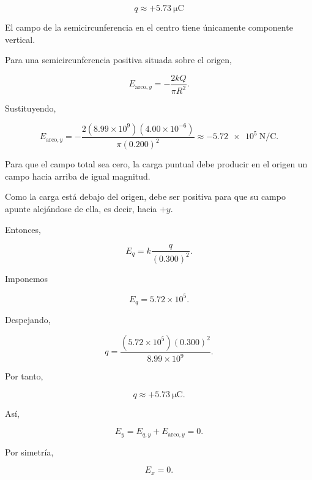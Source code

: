 \begin{respuesta}

\[
\boxed{q\approx+\SI{5.73}{\micro\coulomb}}
\]

\end{respuesta}

\begin{explicacion}

El campo de la semicircunferencia en el centro tiene únicamente componente vertical.

Para una semicircunferencia positiva situada sobre el origen,

\[
E_{\text{arco},y}
=
-\frac{2kQ}{\pi R^2}.
\]

Sustituyendo,

\[
E_{\text{arco},y}
=
-\frac{2(8.99\times10^9)(4.00\times10^{-6})}
{\pi(0.200)^2}
\approx-\SI{5.72e5}{\newton\per\coulomb}.
\]

Para que el campo total sea cero, la carga puntual debe producir en el origen un campo hacia arriba de igual magnitud.

Como la carga está debajo del origen, debe ser positiva para que su campo apunte alejándose de ella, es decir, hacia \(+y\).

Entonces,

\[
E_q=k\frac{q}{(0.300)^2}.
\]

Imponemos

\[
E_q=5.72\times10^5.
\]

Despejando,

\[
q=
\frac{(5.72\times10^5)(0.300)^2}{8.99\times10^9}.
\]

Por tanto,

\[
\boxed{q\approx+\SI{5.73}{\micro\coulomb}}.
\]

Así,

\[
E_y=E_{q,y}+E_{\text{arco},y}=0.
\]

Por simetría,

\[
E_x=0.
\]

\end{explicacion}